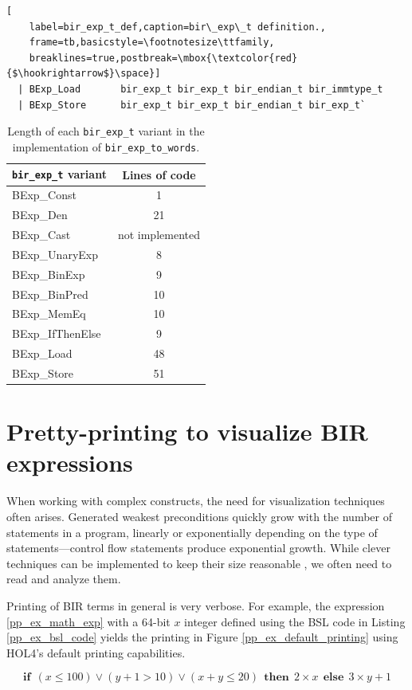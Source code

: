 \documentclass{kththesis}
\begin{document}
{\begin{lstlisting}[
    label=bir_exp_t_def,caption=bir\_exp\_t definition.,
    frame=tb,basicstyle=\footnotesize\ttfamily,
    breaklines=true,postbreak=\mbox{\textcolor{red}{$\hookrightarrow$}\space}]
  | BExp_Load       bir_exp_t bir_exp_t bir_endian_t bir_immtype_t
  | BExp_Store      bir_exp_t bir_exp_t bir_endian_t bir_exp_t`
\end{lstlisting}

\begin{table}[ht!]
    \centering
    \begin{tabular}{ | l | c | }
        \hline
        \texttt{bir\_exp\_t} variant & Lines of code\\
        \hline
        BExp\_Const & 1\\
        BExp\_Den & 21\\
        BExp\_Cast & not implemented\\
        BExp\_UnaryExp & 8\\
        BExp\_BinExp & 9\\
        BExp\_BinPred & 10\\
        BExp\_MemEq & 10\\
        BExp\_IfThenElse & 9\\
        BExp\_Load & 48\\
        BExp\_Store & 51\\
        \hline
    \end{tabular}
    \caption{Length of each \texttt{bir\_exp\_t} variant in the implementation of \texttt{bir\_exp\_to\_words}.}
    \label{bir_exp_to_words_variants_loc}
\end{table}

\section{Pretty-printing to visualize BIR expressions} \label{pretty-printers}

When working with complex constructs, the need for visualization techniques often arises. Generated weakest preconditions quickly grow with the number of statements in a program, linearly or exponentially depending on the type of statements---control flow statements produce exponential growth. While clever techniques can be implemented to keep their size reasonable \cite{lindner_trabin:_2019}, we often need to read and analyze them.

Printing of BIR terms in general is very verbose. For example, the expression \ref{pp_ex_math_exp} with a 64-bit $x$ integer defined using the BSL code in Listing \ref{pp_ex_bsl_code} yields the printing in Figure \ref{pp_ex_default_printing} using HOL4's default printing capabilities.

\begin{equation}
    \textbf{if}~~(x \leq 100) \lor (y + 1 > 10) \lor (x + y \leq 20)~~\textbf{then}~~2 \times x~~\textbf{else}~~3 \times y + 1
    \label{pp_ex_math_exp}
\end{equation}

}
\end{document}

